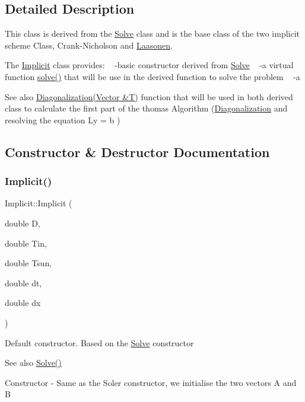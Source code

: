 \subsection{Detailed Description}
This class is derived from the \hyperlink{class_solve}{Solve} class and is the base class of the two implicit scheme Class, Crank-\/\+Nicholson and \hyperlink{class_laasonen}{Laasonen}.

The \hyperlink{class_implicit}{Implicit} class provides\+: ~\newline
-\/basic constructor derived from \hyperlink{class_solve}{Solve} ~\newline
-\/a virtual function \hyperlink{class_implicit_a027adb4276376991f75fcffbd34740b3}{solve()} that will be use in the derived function to solve the problem ~\newline
-\/a \begin{DoxySeeAlso}{See also}
\hyperlink{class_implicit_a572fff2232977c83c432f993f37a7853}{Diagonalization(\+Vector \&\+T)} function that will be used in both derived class to calculate the first part of the thomas Algorithm (\hyperlink{class_implicit_a572fff2232977c83c432f993f37a7853}{Diagonalization} and resolving the equation Ly = b ) 
\end{DoxySeeAlso}


\subsection{Constructor \& Destructor Documentation}
\mbox{\label{class_implicit_afe5ef51232ab8925009f584c679bdfce}} 
\subsubsection{\texorpdfstring{Implicit()}{Implicit()}}
{\footnotesize\ttfamily Implicit\+::\+Implicit (\begin{DoxyParamCaption}\item[{double}]{D,  }\item[{double}]{Tin,  }\item[{double}]{Tsun,  }\item[{double}]{dt,  }\item[{double}]{dx }\end{DoxyParamCaption})}

Default constructor. Based on the \hyperlink{class_solve}{Solve} constructor \begin{DoxySeeAlso}{See also}
\hyperlink{class_solve_a1e0efad6dcf6b09759dd38df7aa08db8}{Solve()}
\end{DoxySeeAlso}
Constructor -\/ Same as the Soler constructor, we initialise the two vectors A and B 

